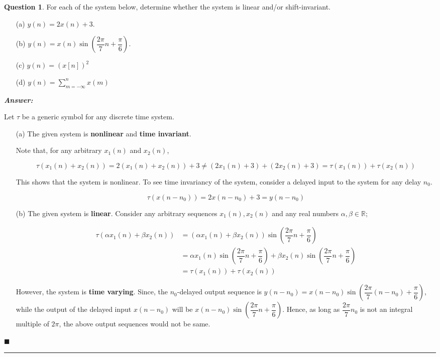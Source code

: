 \documentclass[12pt]{article}
\theoremstyle{definition}
\newtheorem{question}{Question}
\newenvironment{answer}{
    \textbf{\textit{Answer:}} \qquad
}{\hfill $\blacksquare$ \\ \begin{center}
    \rule{0.6\linewidth}{0.5px}    
\end{center}
}
\newcommand{\R}{\mathbb{R}}
\begin{document}
\begin{question}
    For each of the system below, determine whether the system is linear and/or shift-invariant.
    \begin{enumerate}
        \item[(a)] $y(n) = 2x(n) + 3$.
        \item[(b)] $y(n) = x(n) \sin\left( \dfrac{2\pi}{7}n + \dfrac{\pi}{6} \right)$.
        \item[(c)] $y(n) = (x[n])^2$
        \item[(d)] $y(n) = \sum_{m = -\infty}^n x(m)$   
    \end{enumerate}
\end{question}

\begin{answer}
    Let $\tau$ be a generic symbol for any discrete time system.
    \begin{enumerate}
        \item[(a)] The given system is \textbf{nonlinear} and \textbf{time invariant}.
        
        Note that, for any arbitrary $x_1(n)$ and $x_2(n)$, 

        $$
        \tau(x_1(n) + x_2(n)) = 2(x_1(n) + x_2(n)) + 3 \neq (2 x_1(n) + 3) + (2 x_2(n) + 3) = \tau(x_1(n)) + \tau(x_2(n))
        $$

        This shows that the system is nonlinear. To see time invariancy of the system, consider a delayed input to the system for any delay $n_0$.

        $$
        \tau(x(n - n_0)) = 2x(n - n_0) + 3 = y(n - n_0)
        $$

        \item[(b)] The given system is \textbf{linear}. Consider any arbitrary sequences $x_1(n), x_2(n)$ and any real numbers $\alpha, \beta \in \R$;
        
        \begin{align*}
            \tau(\alpha x_1(n) + \beta x_2(n)) 
            & = (\alpha x_1(n) + \beta x_2(n)) \sin\left( \dfrac{2\pi}{7}n + \dfrac{\pi}{6} \right)\\
            & = \alpha x_1(n) \sin\left( \dfrac{2\pi}{7}n + \dfrac{\pi}{6} \right) + \beta x_2(n) \sin\left( \dfrac{2\pi}{7}n + \dfrac{\pi}{6} \right)\\
            & = \tau(x_1(n)) + \tau(x_2(n))            
        \end{align*}

        However, the system is \textbf{time varying}. Since, the $n_0$-delayed output sequence is $y(n - n_0) = x(n-n_0) \sin\left( \dfrac{2\pi}{7}(n - n_0) + \dfrac{\pi}{6} \right)$, while the output of the delayed input $x(n - n_0)$ will be $x(n - n_0)\sin\left( \dfrac{2\pi}{7}n + \dfrac{\pi}{6} \right)$. Hence, as long as $\dfrac{2\pi}{7}n_0$ is not an integral multiple of $2\pi$, the above output sequences would not be same.


\end{enumerate}
\end{answer}
\end{document}
